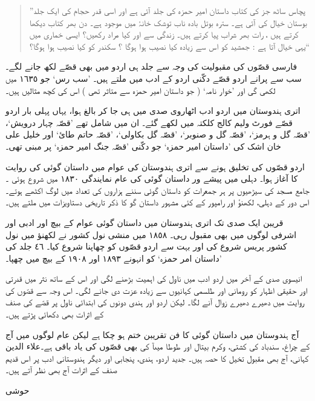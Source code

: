 \documentclass[a4paper]{article}
\newcommand{\deco}{\psvectorian[height=0.75cm]{71}}
\newcommand{\subtitle}[1]{\begingroup\fontsize{24pt}{12pt}\titlefont #1\endgroup\nopagebreak}
\begin{document}
\begin{quote}
”پچاس ساٹھ جز کی کتاب داستان امیر حمزہ کی جلد آئی ہے اور اسی قدر حجام کی ایک جلد بوستان خیال کی آئی ہے۔ سترہ بوتل بادہ ناب توشک خانۂ میں موجود ہے۔ دن بھر کتاب دیکھا کرتے ہیں ، رات بھر شراب پیا کرتے ہیں۔ زندگی سے اور کیا مراد رکھیں؟ ایسی خماری میں یہی خیال آتا ہے : جمشید کو اس سے زیادہ کیا نصیب ہوا ہوگا ؟ سکندر کو کیا نصیب ہوا ہوگا؟“
\end{quote}



فارسی قصّوں کی مقبولیت کی وجہ سے جلد ہی اردو میں بھی قصّے لکھ جانے لگے۔ سب سے پرانے اردو قصّے دکّنی اردو کے  ادب میں ملتے ہیں۔ ’سب رس‘ جو ١٦٣٥ میں لکھی گی اور ’خوار نامہ‘ ( جو داستان  امیر حمزہ سے متاثر تھی ) اس کی کچھ مثالیں ہیں۔

اتری ہندوستان میں اردو ادب اٹھاروی صدی میں ہی جا کر بالغ ہوا، یہاں پہلی بار اردو قصّے فورٹ ولیم کالج کلکتہ میں لکھے گئے۔ ان میں شامل تھے ’قصّہ چہار درویش‘، ’قصّہ گل و ہرمز‘، ’قصّہ گل و صنوبر‘، ’قصّہ گل بکاولی‘، ’قصّہ حاتم طائ‘ اور خلیل علی خان اشک کی ’داستان امیر حمزہ‘ جو دکّنی ’قصّہ جنگ امیر حمزہ‘ پر مبنی تھی۔

اردو قصّوں کی تخلیق ہونے سے اتری ہندوستان کی عوام میں داستان گوئی کی روایت کا آغاز ہوا۔ دہلی  میں  پیشے ور داستان گوئی کی عام نمایندگی ١٨٣٠ میں شروع ہوئی ۔ جامع مسجد کی سیڑھیوں پر ہر  جمعرات کو داستان گوئی سننے ہزاروں کی تعداد میں لوگ اکٹھے ہوتے۔ اس دور کے  دہلی، لکھنؤ اور رامپور کے کئی  مشہور داستان گو کا ذکر تاریخی دستاویزات میں  ملتے ہیں۔

قریبن ایک صدی تک اتری ہندوستان میں داستان گوئی عوام کے بیچ اور ادبی اور اشرفی لوگوں میں بھی مقبول رہی۔ ١٨٥٨ میں منشی نول کشور نے لکھنؤ میں نول کشور پریس شروع کی اور بہت سے اردو قصّوں کو چھاپنا شروع کیا۔ ٤٦ جلد کی ’داستان امر حمزہ‘ کو انہونے ١٨٩٣ اور ١٩٠٨ کے بیچ میں چھپا۔

انیسوی صدی کے آخر میں اردو ادب میں ناول کی اہمیت بڑھنے لگی اور اس کے ساتھ نثر میں قدرتی اور حقیقی اظہار کو رومانی اور طلسمی کہانیوں سے زیادہ عزت دی جانے لگی۔ اس وجہ سے قصّوں کی روایت میں دھیرے  دھیرے زوال آنے لگا۔
لیکن اردو اور ہندی دونوں کی ابتدائی ناول پر قصّے کی صنف کے اثرات بھی دکھائی پڑتے ہیں۔

 آج ہندوستان میں داستان گوئی کا فن تقریبن ختم ہو چکا ہے لیکن عام لوگوں میں آج بھی قصّوں کی یاد باقی ہے۔علاء الدين‎ کے چراغ، سندباد کی کشتی، وکرم بیتال اور طوطا میںآ کی کہانی، آج بھی مقبول تخیل کا حصہ  ہیں۔ جدید اردو، ہندی، پنجابی اور دیگر ہندوستانی ادب پر اس قدیم صنف کے اثرات آج بھی نظر آتے ہیں۔

\begin{center}
\deco

\subtitle{حوشی}
\end{center}
\end{document}

